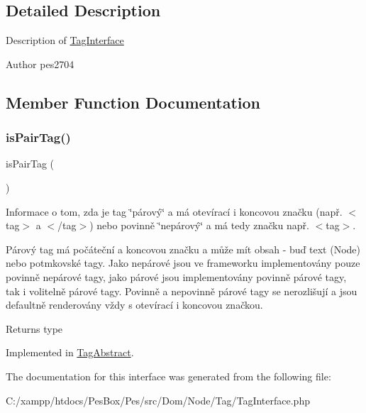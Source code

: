 \subsection{Detailed Description}
Description of \mbox{\hyperlink{interface_pes_1_1_dom_1_1_node_1_1_tag_1_1_tag_interface}{Tag\+Interface}}

\begin{DoxyAuthor}{Author}
pes2704 
\end{DoxyAuthor}


\subsection{Member Function Documentation}
\mbox{\label{interface_pes_1_1_dom_1_1_node_1_1_tag_1_1_tag_interface_a8d496f376687a9da8397563a92d43918}} 
\subsubsection{\texorpdfstring{is\+Pair\+Tag()}{isPairTag()}}
{\footnotesize\ttfamily is\+Pair\+Tag (\begin{DoxyParamCaption}{ }\end{DoxyParamCaption})}

Informace o tom, zda je tag \char`\"{}párový\char`\"{} a má otevírací i koncovou značku (např. $<$tag$>$ a $<$/tag$>$) nebo povinně \char`\"{}nepárový\char`\"{} a má tedy značku např. $<$tag$>$.

Párový tag má počáteční a koncovou značku a může mít obsah -\/ buď text (Node) nebo potmkovské tagy. Jako nepárové jsou ve frameworku implementovány pouze povinně nepárové tagy, jako párové jsou implementovány povinně párové tagy, tak i volitelně párové tagy. Povinně a nepovinně párové tagy se nerozlišují a jsou defaultně renderovány vždy s otevírací i koncovou značkou.

\begin{DoxyReturn}{Returns}
type 
\end{DoxyReturn}


Implemented in \mbox{\hyperlink{class_pes_1_1_dom_1_1_node_1_1_tag_1_1_tag_abstract_a8d496f376687a9da8397563a92d43918}{Tag\+Abstract}}.



The documentation for this interface was generated from the following file\+:\begin{DoxyCompactItemize}
\item 
C\+:/xampp/htdocs/\+Pes\+Box/\+Pes/src/\+Dom/\+Node/\+Tag/Tag\+Interface.\+php\end{DoxyCompactItemize}
